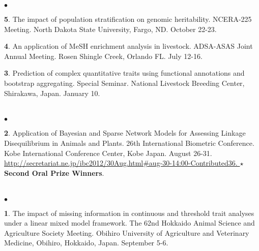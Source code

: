 \documentclass[margin,line,10pt]{res}
\newenvironment{list2}{
  \begin{list}{$\bullet$}{%
      \setlength{\itemsep}{0in}
      \setlength{\parsep}{0in} \setlength{\parskip}{0in}
      \setlength{\topsep}{0in} \setlength{\partopsep}{0in} 
      \setlength{\leftmargin}{0.2in}}}{\end{list}}
\begin{document}
\begin{resume}
\begin{list2}
  \vspace{0.5cm}
  
\item [{\bf 5}.] The impact of population stratification on genomic heritability. NCERA-225 Meeting. North Dakota State University, Fargo, ND. October 22-23. 

  \vspace{0.5cm}

\item [{\bf 4}.] An application of MeSH enrichment analysis in livestock. ADSA-ASAS Joint Annual Meeting. Rosen Shingle Creek, Orlando FL. July 12-16.  

  \vspace{0.5cm}
  
\item [{\bf 3}.] Prediction of complex quantitative traits using functional annotations and bootstrap aggregating. Special Seminar. National Livestock Breeding Center, Shirakawa, Japan. January 10. 
\end{list2}  

\section{}
\begin{list2}
\item  [{\bf 2}.] Application of Bayesian and Sparse Network Models for Assessing Linkage Disequilibrium in Animals and Plants. 26th International Biometric Conference. Kobe International Conference Center, Kobe Japan. August 26-31.
  \textcolor{blue}{\href{http://secretariat.ne.jp/ibc2012/30Aug.html\#aug-30-14:00-Contributed36}{http://secretariat.ne.jp/ibc2012/30Aug.html\#aug-30-14:00-Contributed36. } }   {\bf $\star$Second Oral Prize Winners}.
\end{list2}


\section{}
\begin{list2}
\item  [{\bf 1}.] The impact of missing information in continuous and threshold trait analyses under a linear mixed model framework. The 62nd Hokkaido Animal Science and Agriculture Society Meeting. Obihiro University of Agriculture and Veterinary Medicine, Obihiro, Hokkaido, Japan. September 5-6.
\end{list2}


\vspace{0.5cm}

\end{resume}
\end{document}
